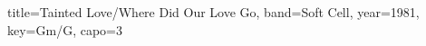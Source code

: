 \documentclass{skrul-leadsheet}
\begin{document}
\newcommand{\lyric}[2]{
\begin{tabular}{|lp{33em}}
\hline
\textbf{#1.} & #2
\end{tabular} \\ }

\begin{song}[transpose-capo=true]{title={Tainted Love/Where Did Our Love Go}, band={Soft Cell}, year={1981}, key={Gm/G}, capo={3}}

\end{song}
\end{document}
